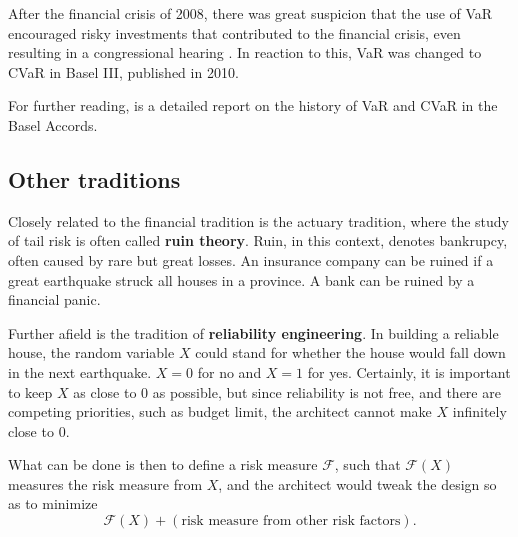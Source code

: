 After the financial crisis of 2008, there was great suspicion that the use of VaR encouraged risky investments that contributed to the financial crisis, even resulting in a congressional hearing \cite{rickardsRisksFinancialModeling2009}. In reaction to this, VaR was changed to CVaR in Basel III, published in 2010.

For further reading, \cite{chenMeasuringMarketRisk2014} is a detailed report on the history of VaR and CVaR in the Basel Accords.

\subsection{Other traditions}
\label{sec:other_traditions}
Closely related to the financial tradition is the actuary tradition, where the study of tail risk is often called \textbf{ruin theory}. Ruin, in this context, denotes bankrupcy, often caused by rare but great losses. An insurance company can be ruined if a great earthquake struck all houses in a province. A bank can be ruined by a financial panic.

Further afield is the tradition of \textbf{reliability engineering}. In building a reliable house, the random variable $X$ could stand for whether the house would fall down in the next earthquake. $X=0$ for no and $X=1$ for yes. Certainly, it is important to keep $X$ as close to $0$ as possible, but since reliability is not free, and there are competing priorities, such as budget limit, the architect cannot make $X$ infinitely close to $0$. 

What can be done is then to define a risk measure $\mathcal{F}$, such that $\mathcal{F}(X)$ measures the risk measure from $X$, and the architect would tweak the design so as to minimize
$$\mathcal{F}(X) + (\text{risk measure from other risk factors}).$$